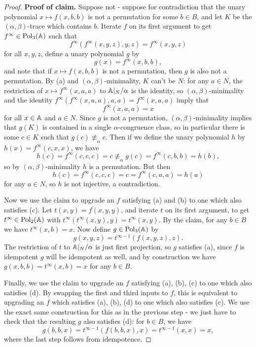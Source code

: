 \begin{appendices}
\begin{proof}
{\bf Proof of claim.} Suppose not - suppose for contradiction that the unary polynomial $x \mapsto f(x,b,b)$ is not a permutation for some $b \in B$, and let $K$ be the $(\alpha,\beta)$-trace which contains $b$. Iterate $f$ on its first argument to get $f^\infty \in \operatorname{Pol}_3(\mathbb{A})$ such that
\[
f^\infty(f^\infty(x,y,z),y,z) = f^\infty(x,y,z)
\]
for all $x,y,z$, define a unary polynomial $g$ by
\[
g(x) = f^\infty(x,b,b),
\]
and note that if $x \mapsto f(x,b,b)$ is not a permutation, then $g$ is also not a permutation. By (a) and $(\alpha,\beta)$-minimality, $K$ can't be $N$: for any $a \in N$, the restriction of $x \mapsto f^\infty(x,a,a)$ to $\mathbb{A}|_N/\alpha$ is the identity, so $(\alpha,\beta)$-minimality and the identity $f^\infty(f^\infty(x,a,a),a,a) = f^\infty(x,a,a)$ imply that
\[
f^\infty(x,a,a) = x
\]
for all $x \in \mathbb{A}$ and $a \in N$. Since $g$ is not a permutation, $(\alpha,\beta)$-minimality implies that $g(K)$ is contained in a single $\alpha$-congruence class, so in particular there is some $c \in K$ such that $g(c) \not\equiv_\alpha c$. Then if we define the unary polynomial $h$ by $h(x) = f^\infty(c,x,x)$, we have
\[
h(c) = f^\infty(c,c,c) = c \not\equiv_\alpha g(c) = f^\infty(c,b,b) = h(b),
\]
so by $(\alpha,\beta)$-minimality $h$ is a permutation. But then
\[
h(c) = f^\infty(c,c,c) = c = f^\infty(c,a,a) = h(a)
\]
for any $a \in N$, so $h$ is not injective, a contradiction.

Now we use the claim to upgrade an $f$ satisfying (a) and (b) to one which also satisfies (c). Let $t(x,y) = f(x,y,y)$, and iterate $t$ on its first argument, to get $t^\infty \in \operatorname{Pol}_2(\mathbb{A})$ with $t^\infty(t^\infty(x,y),y) = t^\infty(x,y)$. By the claim, for any $b \in B$ we have $t^\infty(x,b) = x$. Now define $g \in \operatorname{Pol}_3(\mathbb{A})$ by
\[
g(x,y,z) = t^{\infty-1}(f(x,y,z),z).
\]
The restriction of $t$ to $\mathbb{A}|_N/\alpha$ is just first projection, so $g$ satisfies (a), since $f$ is idempotent $g$ will be idempotent as well, and by construction we have $g(x,b,b) = t^\infty(x,b) = x$ for any $b \in B$.

Finally, we use the claim to upgrade an $f$ satisfying (a), (b), (c) to one which also satisfies (d). By swapping the first and third inputs to $f$, this is equivalent to upgrading an $f$ which satisfies (a), (b), (d) to one which also satisfies (c). We use the exact same construction for this as in the previous step - we just have to check that the resulting $g$ also satisfies (d): for $b \in B$, we have
\[
g(b,b,x) = t^{\infty-1}(f(b,b,x),x) = t^{\infty-1}(x,x) = x,
\]
where the last step follows from idempotence.
\end{proof}


\end{appendices}
